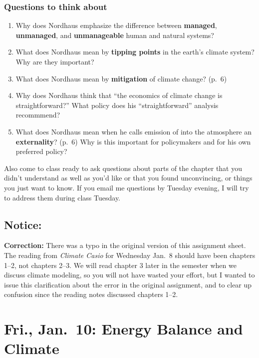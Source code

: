 \documentclass[
]{article}
\providecommand{\tightlist}{%
  \setlength{\itemsep}{0pt}\setlength{\parskip}{0pt}}
\newcommand{\COO}{\ce{CO2}}
\begin{document}
\hypertarget{questions-to-think-about-1}{%
\subsubsection{Questions to think
about}\label{questions-to-think-about-1}}

\begin{enumerate}
\def\labelenumi{\arabic{enumi}.}
\tightlist
\item
  Why does Nordhaus emphasize the difference between \textbf{managed},
  \textbf{unmanaged}, and \textbf{unmanageable} human and natural
  systems?
\item
  What does Nordhaus mean by \textbf{tipping points} in the earth's
  climate system? Why are they important?
\item
  What does Nordhaus mean by \textbf{mitigation} of climate change?
  (p.~6)
\item
  Why does Nordhaus think that ``the economics of climate change is
  straightforward?'' What policy does his ``straightforward'' analysis
  recommmend?
\item
  What does Nordhaus mean when he calls emission of \COO{} into the
  atmosphere an \textbf{externality}? (p.~6) Why is this important for
  policymakers and for his own preferred policy?
\end{enumerate}

Also come to class ready to ask questions about parts of the chapter
that you didn't understand as well as you'd like or that you found
unconvincing, or things you just want to know. If you email me questions
by Tuesday evening, I will try to address them during class Tuesday.

\hypertarget{notice}{%
\subsection{Notice:}\label{notice}}

\textbf{Correction:} There was a typo in the original version of this
assignment sheet. The reading from \emph{Climate Casio} for Wednesday
Jan.~8 should have been chapters 1--2, not chapters 2--3. We will read
chapter 3 later in the semester when we discuss climate modeling, so you
will not have wasted your effort, but I wanted to issue this
clarification about the error in the original assignment, and to clear
up confusion since the reading notes discussed chapters 1--2.

\hypertarget{fri.-jan.-10-energy-balance-and-climate}{%
\section{Fri., Jan.~10: Energy Balance and
Climate}\label{fri.-jan.-10-energy-balance-and-climate}}
\end{document}
